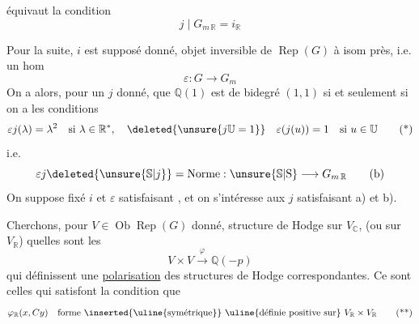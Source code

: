 équivaut  la condition
\[
j\mid G_{m\,\mathbb{R}}=i_{\mathbb{R}}\tag*{(a)}
\]

Pour la suite, $i$ est supposé donné,  objet inversible  de $\operatorname{Rep}(G)$ à isom près, i.e. un hom \unsure{$\varepsilon$}
\[
\varepsilon:G\longrightarrow G_m
\]
On a alors, pour un $j$ donné, que $\mathbb{Q}(1)$ est de bidegré $(1,1)$ si et seulement si on a les conditions
\[
\varepsilon j(\lambda)=\lambda^2\quad\text{si }\lambda\in\mathbb{R}^{*},\quad
\deleted{\unsure{j\mathbb{U}=1}}\quad
\varepsilon(j(u))=1\quad\text{si }u\in\mathbb{U}\tag*{(*)}
\]
i.e.
\[
\varepsilon j\deleted{\unsure{\mathbb{S}|j}}=\mathrm{Norme}:\unsure{\mathbb{S}|\mathrm{S}}\longrightarrow G_{m\,\mathbb{R}}\tag*{(b)}
\]
On suppose fixé $i$ et $\varepsilon$ satisfaisant , et on s'intéresse aux $j$ satisfaisant a) et b).

 Cherchons, pour $V\in\operatorname{Ob}\operatorname{Rep}(G)$ donné,  structure de Hodge sur $V_{\mathbb{C}}$, (ou sur $V_{\mathbb{R}}$) quelles sont les 
\[
V\times V\xrightarrow{\varphi}\mathbb{Q}(-p)
\]
qui définissent une \uline{polarisation} des structures de Hodge correspondantes. Ce sont celles qui satisfont  la condition que
\[
\varphi_{\mathbb{R}}(x,Cy)\quad\text{forme \inserted{\uline{symétrique}} \uline{définie positive sur} } V_{\mathbb{R}}\times V_{\mathbb{R}}\tag*{(**)}
\]

